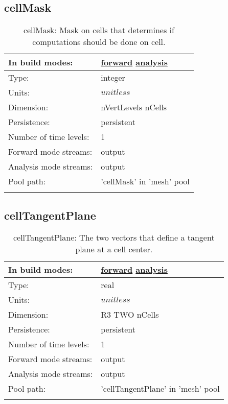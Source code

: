 \subsection[cellMask]{cellMask}
\label{subsec:var_sec_mesh_cellMask}
\begin{center}
\begin{longtable}{| p{2.0in} | p{4.0in} |}
        \hline 
        In build modes: & \hyperref[subsec:forward_var_tab_mesh]{forward} \hyperref[subsec:analysis_var_tab_mesh]{analysis} \\
        \hline 
        Type: & integer \\
        \hline 
        Units: & $unitless$ \\
        \hline 
        Dimension: & nVertLevels nCells \\
        \hline 
        Persistence: & persistent \\
        \hline 
        Number of time levels: & 1 \\
        \hline 
		 Forward mode streams: &  output \\
        \hline 
		 Analysis mode streams: &  output \\
        \hline 
            Pool path: & 'cellMask' in 'mesh' pool
 \\
		 \hline 
    \caption{cellMask: Mask on cells that determines if computations should be done on cell.}
\end{longtable}
\end{center}
\subsection[cellTangentPlane]{cellTangentPlane}
\label{subsec:var_sec_mesh_cellTangentPlane}
\begin{center}
\begin{longtable}{| p{2.0in} | p{4.0in} |}
        \hline 
        In build modes: & \hyperref[subsec:forward_var_tab_mesh]{forward} \hyperref[subsec:analysis_var_tab_mesh]{analysis} \\
        \hline 
        Type: & real \\
        \hline 
        Units: & $unitless$ \\
        \hline 
        Dimension: & R3 TWO nCells \\
        \hline 
        Persistence: & persistent \\
        \hline 
        Number of time levels: & 1 \\
        \hline 
		 Forward mode streams: &  output \\
        \hline 
		 Analysis mode streams: &  output \\
        \hline 
            Pool path: & 'cellTangentPlane' in 'mesh' pool
 \\
		 \hline 
    \caption{cellTangentPlane: The two vectors that define a tangent plane at a cell center.}
\end{longtable}
\end{center}
